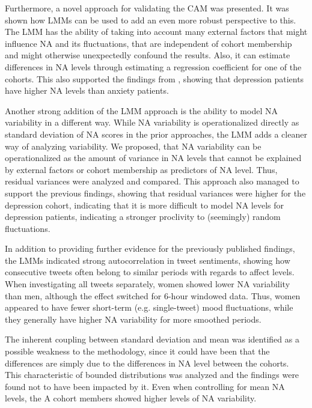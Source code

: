 Furthermore, a novel approach for validating the CAM was presented. It was shown how LMMs can be used to add an even more robust perspective to this. The LMM has the ability of taking into account many external factors that might influence NA and its fluctuations, that are independent of cohort membership and might otherwise unexpectedly confound the results. Also, it can estimate differences in NA levels through estimating a regression coefficient for one of the cohorts. This also supported the findings from \citet{rutter2024}, showing that depression patients have higher NA levels than anxiety patients.

Another strong addition of the LMM approach is the ability to model NA variability in a different way. While NA variability is operationalized directly as standard deviation of NA scores in the prior approaches, the LMM adds a cleaner way of analyzing variability. We proposed, that NA variability can be operationalized as the amount of variance in NA levels that cannot be explained by external factors or cohort membership as predictors of NA level. Thus, residual variances were analyzed and compared. This approach also managed to support the previous findings, showing that residual variances were higher for the depression cohort, indicating that it is more difficult to model NA levels for depression patients, indicating a stronger proclivity to (seemingly) random fluctuations.

In addition to providing further evidence for the previously published findings, the LMMs indicated strong autocorrelation in tweet sentiments, showing how consecutive tweets often belong to similar periods with regards to affect levels. When investigating all tweets separately, women showed lower NA variability than men, although the effect switched for 6-hour windowed data. Thus, women appeared to have fewer short-term (e.g. single-tweet) mood fluctuations, while they generally have higher NA variability for more smoothed periods.

The inherent coupling between standard deviation and mean was identified as a possible weakness to the methodology, since it could have been that the differences are simply due to the differences in NA level between the cohorts. This characteristic of bounded distributions was analyzed and the findings were found not to have been impacted by it. Even when controlling for mean NA levels, the A cohort members showed higher levels of NA variability.

